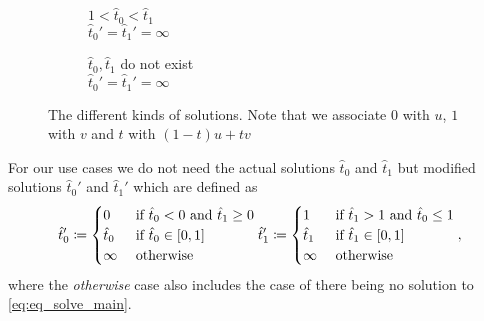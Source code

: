 \begin{figure}
\begin{subfigure}[b]{0.3\textwidth}
        \caption{\(1 < \hat t_0 < \hat t_1\)\\ \(\hat t_0' =  \hat t_1' = \infty\)}
        \label{fig:sub6}
    \end{subfigure}

    \begin{subfigure}[b]{0.3\textwidth}
        \centering
        \caption{\(\hat t_0, \hat t_1\) do not exist\\ \(\hat t_0' = \hat t_1' = \infty\)}
        \label{fig:sub7}
    \end{subfigure}
    \caption{The different kinds of solutions. Note that we associate \(0\) with \(u\), \(1\) with \(v\) and \(t\) with \((1-t)u + tv\)}
    \label{fig:main}
\end{figure}

For our use cases we do not need the actual solutions \(\hat{t}_0\) and \(\hat{t}_1\) but modified solutions \(\hat{t}_0'\) and \(\hat{t}_1'\) which are defined as 
\begin{equation}
  \hat{t}_0' \coloneq \begin{cases}
    0 & \textrm{ if } \hat{t}_0 < 0 \textrm{ and } \hat{t}_1 \geq 0\\
    \hat{t}_0 & \textrm{ if } \hat{t}_0 \in [0, 1]\\
    \infty &\textrm{ otherwise }
  \end{cases}\\
  \hat{t}_1' \coloneq \begin{cases}
    1 & \textrm{ if } \hat{t}_1 > 1 \textrm{ and } \hat{t}_0 \leq 1\\
    \hat{t}_1 & \textrm{ if } \hat{t}_1 \in [0, 1]\\
    \infty &\textrm{ otherwise }
  \end{cases},
\end{equation}
where the \emph{otherwise} case also includes the case of there being no solution to \cref{eq:eq_solve_main}. 

